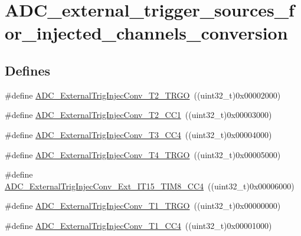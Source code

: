 \hypertarget{group__ADC__external__trigger__sources__for__injected__channels__conversion}{
\section{ADC\_\-external\_\-trigger\_\-sources\_\-for\_\-injected\_\-channels\_\-conversion}
\label{group__ADC__external__trigger__sources__for__injected__channels__conversion}
}
\subsection*{Defines}
\begin{DoxyCompactItemize}
\item 
\#define \hyperlink{group__ADC__external__trigger__sources__for__injected__channels__conversion_gaaad112b2b035dfd77c9743197c51b16f}{ADC\_\-ExternalTrigInjecConv\_\-T2\_\-TRGO}~((uint32\_\-t)0x00002000)
\item 
\#define \hyperlink{group__ADC__external__trigger__sources__for__injected__channels__conversion_ga49089501c5bf2a2c22019fbca4b688e9}{ADC\_\-ExternalTrigInjecConv\_\-T2\_\-CC1}~((uint32\_\-t)0x00003000)
\item 
\#define \hyperlink{group__ADC__external__trigger__sources__for__injected__channels__conversion_ga6c9ddf9bba0cefe77dbcd601aed24f7b}{ADC\_\-ExternalTrigInjecConv\_\-T3\_\-CC4}~((uint32\_\-t)0x00004000)
\item 
\#define \hyperlink{group__ADC__external__trigger__sources__for__injected__channels__conversion_gab12e5503085cdb9dde4a59614e421284}{ADC\_\-ExternalTrigInjecConv\_\-T4\_\-TRGO}~((uint32\_\-t)0x00005000)
\item 
\#define \hyperlink{group__ADC__external__trigger__sources__for__injected__channels__conversion_gaa23965b742e08142e5d1c453166dbcc2}{ADC\_\-ExternalTrigInjecConv\_\-Ext\_\-IT15\_\-TIM8\_\-CC4}~((uint32\_\-t)0x00006000)
\item 
\#define \hyperlink{group__ADC__external__trigger__sources__for__injected__channels__conversion_gabf47f66e60c166f6b63b805f72ad94b0}{ADC\_\-ExternalTrigInjecConv\_\-T1\_\-TRGO}~((uint32\_\-t)0x00000000)
\item 
\#define \hyperlink{group__ADC__external__trigger__sources__for__injected__channels__conversion_gabd27bcc6ff5af6713a124b3801759bcf}{ADC\_\-ExternalTrigInjecConv\_\-T1\_\-CC4}~((uint32\_\-t)0x00001000)

\end{DoxyCompactItemize}
